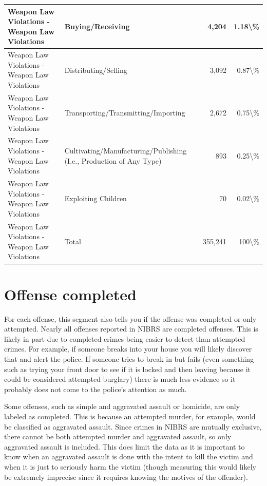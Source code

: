 \documentclass[
]{krantz}
\begin{document}
\begin{longtable}[t]{l|l|r|r}
\hline
Weapon Law Violations - Weapon Law Violations & Buying/Receiving & 4,204 & 1.18\textbackslash{}\%\\
\hline
Weapon Law Violations - Weapon Law Violations & Distributing/Selling & 3,092 & 0.87\textbackslash{}\%\\
\hline
Weapon Law Violations - Weapon Law Violations & Transporting/Transmitting/Importing & 2,672 & 0.75\textbackslash{}\%\\
\hline
Weapon Law Violations - Weapon Law Violations & Cultivating/Manufacturing/Publishing (I.e., Production of Any Type) & 893 & 0.25\textbackslash{}\%\\
\hline
Weapon Law Violations - Weapon Law Violations & Exploiting Children & 70 & 0.02\textbackslash{}\%\\
\hline
Weapon Law Violations - Weapon Law Violations & Total & 355,241 & 100\textbackslash{}\%\\
\hline
\end{longtable}

\section{Offense completed}\label{offense-completed}

For each offense, this segment also tells you if the offense
was completed or only attempted. Nearly all offenses
reported in NIBRS are completed offenses. This is likely in
part due to completed crimes being easier to detect than
attempted crimes. For example, if someone breaks into your
house you will likely discover that and alert the police. If
someone tries to break in but fails (even something such as
trying your front door to see if it is locked and then
leaving because it could be considered attempted burglary)
there is much less evidence so it probably does not come to
the police's attention as much.

Some offenses, such as simple and aggravated assault or
homicide, are only labeled as completed. This is because an
attempted murder, for example, would be classified as
aggravated assault. Since crimes in NIBRS are mutually
exclusive, there cannot be both attempted murder and
aggravated assault, so only aggravated assault is included.
This does limit the data as it is important to know when an
aggravated assault is done with the intent to kill the
victim and when it is just to seriously harm the victim
(though measuring this would likely be extremely imprecise
since it requires knowing the motives of the offender).
\end{document}
